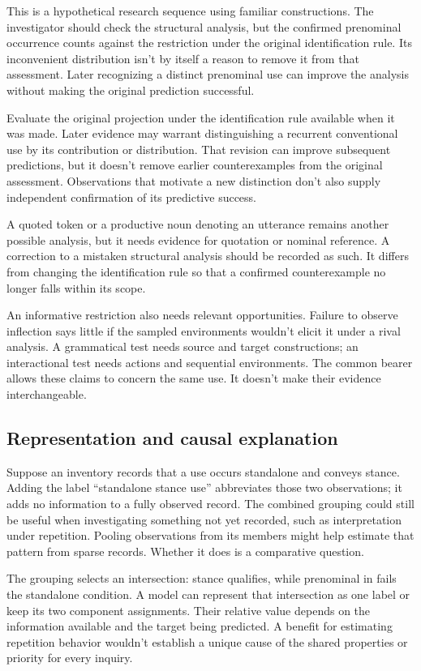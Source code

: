 \documentclass[12pt]{article}
\begin{document}
This is a hypothetical research sequence using familiar constructions.
The investigator should check the structural analysis, but the confirmed
prenominal occurrence counts against the restriction under the original
identification rule. Its inconvenient distribution isn't by itself a
reason to remove it from that assessment. Later recognizing a distinct
prenominal use can improve the analysis without making the original
prediction successful.

Evaluate the original projection under the identification rule available
when it was made. Later evidence may warrant distinguishing a recurrent
conventional use by its contribution or distribution. That revision
can improve subsequent predictions, but it doesn't remove earlier
counterexamples from the original assessment. Observations that motivate
a new distinction don't also supply independent confirmation of its
predictive success.

A quoted token or a productive noun denoting an utterance remains
another possible analysis, but it needs evidence for quotation or
nominal reference. A correction to a mistaken structural analysis should
be recorded as such. It differs from changing the identification rule
so that a confirmed counterexample no longer falls within its scope.

An informative restriction also needs relevant opportunities. Failure
to observe inflection says little if the sampled environments wouldn't
elicit it under a rival analysis. A grammatical test needs source and
target constructions; an interactional test needs actions and sequential
environments. The common bearer allows these claims to concern the
same use. It doesn't make their evidence interchangeable.

\subsection{Representation and causal explanation}

Suppose an inventory records that a use occurs standalone and conveys
stance. Adding the label \enquote{standalone stance use} abbreviates
those two observations; it adds no information to a fully observed
record. The combined grouping could still be useful when investigating
something not yet recorded, such as interpretation under repetition.
Pooling observations from its members might help estimate that pattern
from sparse records. Whether it does is a comparative question.

The grouping selects an intersection: stance  qualifies,
while prenominal  in  fails the
standalone condition. A model can represent that intersection as one
label or keep its two component assignments. Their relative value
depends on the information available and the target being predicted.
A benefit for estimating repetition behavior wouldn't establish a
unique cause of the shared properties or priority for every inquiry.
\end{document}
